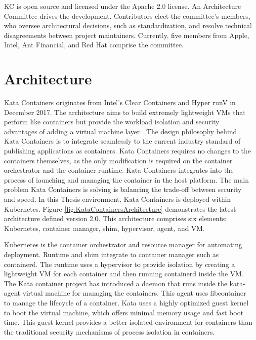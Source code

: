 KC is open source and licensed under the Apache 2.0 license. An Architecture Committee drives the development. Contributors elect the committee's members, who oversee architectural decisions, such as standardization, and resolve technical disagreements between project maintainers. Currently, five members from Apple, Intel, Ant Financial, and Red Hat comprise the committee. \cite{KataContainers}\cite{KataContainersGovernance}

\section{Architecture}

Kata Containers originates from Intel's Clear Containers \cite{ClearContainers} and Hyper runV \cite{runV} in December 2017. The architecture aims to build extremely lightweight VMs that perform like containers but provide the workload isolation and security advantages of adding a virtual machine layer \cite{Randazzo2019}. The design philosophy behind Kata Containers is to integrate seamlessly to the current industry standard of publishing applications as containers. Kata Containers requires no changes to the containers themselves, as the only modification is required on the container orchestrator and the container runtime. Kata Containers integrates into the process of launching and managing the container in the host platform. The main problem Kata Containers is solving is balancing the trade-off between security and speed. In this Thesis environment, Kata Containers is deployed within Kubernetes. Figure \ref{fig:KataContainersArchitecture} demonstrates the latest architecture defined version 2.0. This architecture comprises six elements: Kubernetes, container manager, shim, hypervisor, agent, and VM.

Kubernetes is the container orchestrator and resource manager for automating deployment. Runtime and shim integrate to container manager such as containerd. The runtime uses a hypervisor to provide isolation by creating a lightweight VM for each container and then running containerd inside the VM. The Kata container project has introduced a daemon that runs inside the kata-agent virtual machine for managing the containers. This agent uses libcontainer to manage the lifecycle of a container. Kata uses a highly optimized guest kernel to boot the virtual machine, which offers minimal memory usage and fast boot time. This guest kernel provides a better isolated environment for containers than the traditional security mechanisms of process isolation in containers. \cite{Kumar2020}


